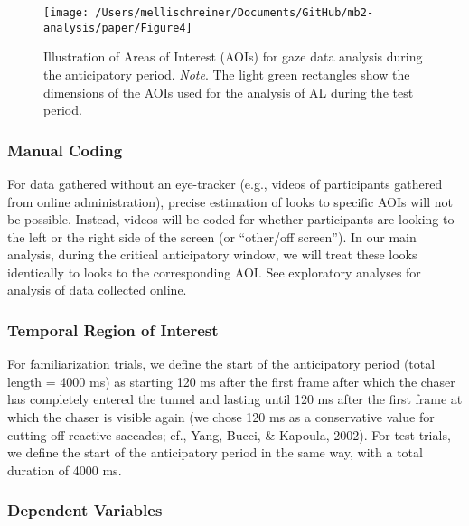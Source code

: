 \documentclass[
  english,
  man,floatsintext]{apa6}
\begin{document}
\begin{figure}

{\centering \texttt{[image: /Users/mellischreiner/Documents/GitHub/mb2-analysis/paper/Figure4]} 

}

\caption{Illustration of Areas of Interest (AOIs) for gaze data analysis during the anticipatory period. \newline{} \textit{Note}. The light green rectangles show the dimensions of the AOIs used for the analysis of AL during the test period.}\label{fig:fig4}
\end{figure}

\hypertarget{manual-coding}{%
\subsubsection{Manual Coding}\label{manual-coding}}

For data gathered without an eye-tracker (e.g., videos of participants gathered from online administration), precise estimation of looks to specific AOIs will not be possible. Instead, videos will be coded for whether participants are looking to the left or the right side of the screen (or ``other/off screen''). In our main analysis, during the critical anticipatory window, we will treat these looks identically to looks to the corresponding AOI. See exploratory analyses for analysis of data collected online.

\hypertarget{temporal-region-of-interest}{%
\subsubsection{Temporal Region of Interest}\label{temporal-region-of-interest}}

For familiarization trials, we define the start of the anticipatory period (total length = 4000 ms) as starting 120 ms after the first frame after which the chaser has completely entered the tunnel and lasting until 120 ms after the first frame at which the chaser is visible again (we chose 120 ms as a conservative value for cutting off reactive saccades; cf., Yang, Bucci, \& Kapoula, 2002). For test trials, we define the start of the anticipatory period in the same way, with a total duration of 4000 ms.

\hypertarget{dependent-variables}{%
\subsubsection{Dependent Variables}\label{dependent-variables}}
\end{document}

